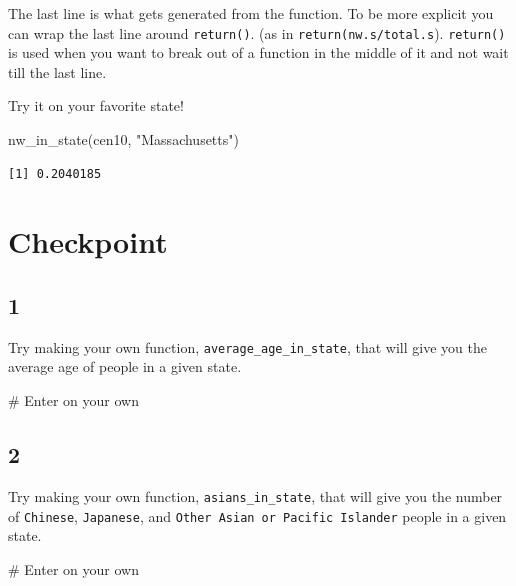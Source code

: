 \documentclass[
  letterpaper,
]{book}
\newenvironment{Shaded}{\begin{snugshade}}{\end{snugshade}}
\newcommand{\CommentTok}[1]{\textcolor[rgb]{0.37,0.37,0.37}{#1}}
\newcommand{\FunctionTok}[1]{\textcolor[rgb]{0.28,0.35,0.67}{#1}}
\newcommand{\NormalTok}[1]{\textcolor[rgb]{0.00,0.23,0.31}{#1}}
\newcommand{\StringTok}[1]{\textcolor[rgb]{0.13,0.47,0.30}{#1}}
\theoremstyle{definition}
\theoremstyle{definition}
\theoremstyle{plain}
\theoremstyle{definition}
\theoremstyle{plain}
\theoremstyle{plain}
\theoremstyle{remark}
\begin{document}
The last line is what gets generated from the function. To be more
explicit you can wrap the last line around \texttt{return()}. (as in
\texttt{return(nw.s/total.s}). \texttt{return()} is used when you want
to break out of a function in the middle of it and not wait till the
last line.

Try it on your favorite state!

\begin{Shaded}
\begin{Highlighting}[]
\FunctionTok{nw\_in\_state}\NormalTok{(cen10, }\StringTok{"Massachusetts"}\NormalTok{)}
\end{Highlighting}
\end{Shaded}

\begin{verbatim}
[1] 0.2040185
\end{verbatim}

\hypertarget{checkpoint}{%
\section*{Checkpoint}\label{checkpoint}}

\hypertarget{section}{%
\subsection*{1}\label{section}}

Try making your own function, \texttt{average\_age\_in\_state}, that
will give you the average age of people in a given state.

\begin{Shaded}
\begin{Highlighting}[]
\CommentTok{\# Enter on your own}
\end{Highlighting}
\end{Shaded}

\hypertarget{section-1}{%
\subsection*{2}\label{section-1}}

Try making your own function, \texttt{asians\_in\_state}, that will give
you the number of \texttt{Chinese}, \texttt{Japanese}, and
\texttt{Other\ Asian\ or\ Pacific\ Islander} people in a given state.

\begin{Shaded}
\begin{Highlighting}[]
\CommentTok{\# Enter on your own}
\end{Highlighting}
\end{Shaded}
\end{document}
